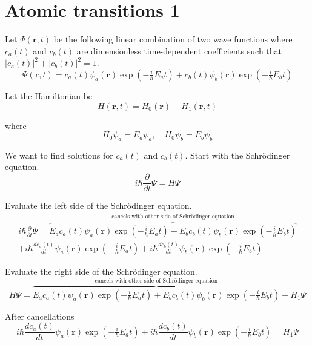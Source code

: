 

\section*{Atomic transitions 1}

Let $\Psi(\mathbf r,t)$ be the following linear combination of two wave functions
where $c_a(t)$ and $c_b(t)$ are dimensionless time-dependent coefficients
such that $|c_a(t)|^2+|c_b(t)|^2=1$.
\begin{equation*}
\Psi(\mathbf r,t)
=c_a(t)\psi_a(\mathbf r)\exp\left(-\tfrac{i}{\hbar}E_at\right)
+c_b(t)\psi_b(\mathbf r)\exp\left(-\tfrac{i}{\hbar}E_bt\right)
\end{equation*}

Let the Hamiltonian be
\begin{equation*}
H(\mathbf r,t)=H_0(\mathbf r)+H_1(\mathbf r,t)
\end{equation*}

where
\begin{equation*}
H_0\psi_a=E_a\psi_a,\quad H_0\psi_b=E_b\psi_b
\end{equation*}

We want to find solutions for $c_a(t)$ and $c_b(t)$.
Start with the Schr\"odinger equation.
\begin{equation*}
i\hbar\frac{\partial}{\partial t}\Psi=H\Psi
\end{equation*}

Evaluate the left side of the Schr\"odinger equation.
\begin{multline*}
i\hbar\frac{\partial}{\partial t}\Psi
=\overbrace{E_ac_a(t)\psi_a(\mathbf r)\exp\left(-\tfrac{i}{\hbar}E_at\right)
+E_bc_b(t)\psi_b(\mathbf r)\exp\left(-\tfrac{i}{\hbar}E_bt\right)}
^\text{cancels with other side of Schr\"odinger equation}
\\
+i\hbar\frac{dc_a(t)}{dt}\psi_a(\mathbf r)\exp\left(-\tfrac{i}{\hbar}E_at\right)
+i\hbar\frac{dc_b(t)}{dt}\psi_b(\mathbf r)\exp\left(-\tfrac{i}{\hbar}E_bt\right)
\end{multline*}

Evaluate the right side of the Schr\"odinger equation.
\begin{equation*}
H\Psi
=\overbrace{E_ac_a(t)\psi_a(\mathbf r)\exp\left(-\tfrac{i}{\hbar}E_at\right)
+E_bc_b(t)\psi_b(\mathbf r)\exp\left(-\tfrac{i}{\hbar}E_bt\right)}
^\text{cancels with other side of Schr\"odinger equation}
+H_1\Psi
\end{equation*}

After cancellations
\begin{equation*}
i\hbar\frac{dc_a(t)}{dt}\psi_a(\mathbf r)\exp\left(-\tfrac{i}{\hbar}E_at\right)
+i\hbar\frac{dc_b(t)}{dt}\psi_b(\mathbf r)\exp\left(-\tfrac{i}{\hbar}E_bt\right)
=H_1\Psi
\tag{1}
\end{equation*}

